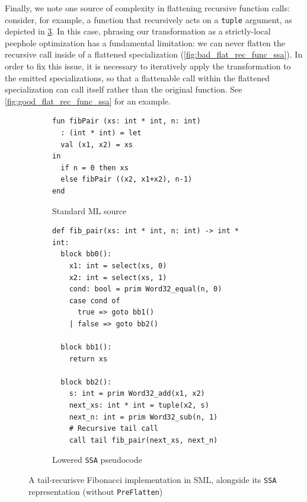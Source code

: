 

Finally, we note one source of complexity in flattening recursive function
calls: consider, for example, a function that recursively acts on
a \texttt{tuple} argument, as depicted in \cref{fig:rec_func_sml_ssa}. In this
case, phrasing our transformation as a strictly-local peephole optimization has
a fundamental limitation: we can never flatten the recursive call inside of a
flattened specialization (\cref{fig:bad_flat_rec_func_ssa}). In order to fix
this issue, it is necessary to iteratively apply the transformation to the
emitted specializations, so that a flattenable call within the flattened
specialization can call itself rather than the original function.
See \cref{fig:good_flat_rec_func_ssa} for an example.

\begin{figure}[htbp]
  \centering
  \begin{subfigure}[t]{0.43\textwidth}
    \caption{Standard ML source}
    \label{fig:rec_func_sml}
    \vspace{1mm}
\begin{verbatim}
fun fibPair (xs: int * int, n: int)
  : (int * int) = let
  val (x1, x2) = xs
in
  if n = 0 then xs
  else fibPair ((x2, x1+x2), n-1)
end
\end{verbatim}
  \end{subfigure}\hfill
  \begin{subfigure}[t]{0.55\textwidth}
    \caption{Lowered \texttt{SSA} pseudocode}
    \label{fig:rec_func_ssa}
    \vspace{1mm}
\begin{verbatim}
def fib_pair(xs: int * int, n: int) -> int * int:
  block bb0():
    x1: int = select(xs, 0)
    x2: int = select(xs, 1)
    cond: bool = prim Word32_equal(n, 0)
    case cond of
      true => goto bb1()
    | false => goto bb2()

  block bb1():
    return xs

  block bb2():
    s: int = prim Word32_add(x1, x2)
    next_xs: int * int = tuple(x2, s)
    next_n: int = prim Word32_sub(n, 1)
    # Recursive tail call
    call tail fib_pair(next_xs, next_n)
\end{verbatim}
  \end{subfigure}
  \caption{A tail-recurisve Fibonacci implementation in SML, alongside its
  \texttt{SSA} representation (without \texttt{PreFlatten})}
  \label{fig:rec_func_sml_ssa}
\end{figure}

